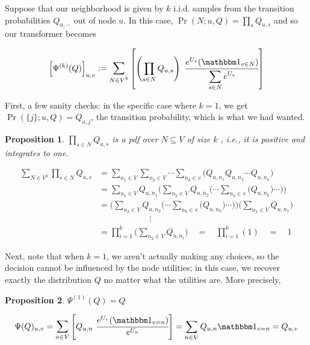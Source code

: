 \documentclass{article}
\newtheorem{prop}{Proposition}
\theoremstyle{definition}
\begin{document}
	Suppose that our neighborhood is given by $k$ i.i.d. samples from the transition probabilities $Q_{u,-}$ out of node $u$. In this case, $\Pr(N;u,Q) = \prod_{s} Q_{u,s}$ and so our transformer becomes
	
	\begin{equation}
		\Big[\Psi^{(k)}(Q)\Big]_{u,v} := \mathlarger{\sum}_{N \in V^{k}} \left[\left(\prod_{s \in N}Q_{u,s}\right) ~\cfrac{ e^{U_v}  (\mathbbm 1_{v \in N})}{ \displaystyle \sum\limits_{ s \in N } e^{U_s} } \right]
	\end{equation}
	
	First, a few sanity checks: in the specific case where $k = 1$, we get $\Pr(\{j\}; u, Q) = Q_{u,j}$, the transition probability, which is what we had wanted.\\
	
	\begin{prop}
		$\prod_{s \in N}Q_{u,s}$ is a pdf over $N \subseteq V$ of size $k$ , i.e., it is positive and integrates to one.
	\end{prop}
	\begin{prf}
		\begin{align*}
			\sum_{N \in V^{k}}\prod_{s \in N}Q_{u,s} &= 
				\sum_{n_1 \in V} \sum_{n_2 \in V}\cdots \sum_{n_k \in v} \Big(Q_{u,n_1}Q_{u,n_2} \cdots Q_{u,n_k}\Big) \\
				&= \sum_{n_1 \in V} Q_{u,n_1} \Big(\sum_{n_2 \in V}Q_{u,n_2} \Big( \cdots \sum_{n_k \in v} \Big(Q_{u,n_k}\Big)\cdots\Big)\Big) \\
				&= \Big(\sum_{n_2 \in V}Q_{u,n_2} \Big( \cdots \sum_{n_k \in v} \Big(Q_{u,n_k}\Big)\cdots\Big)\Big) \Big(\sum_{n_1 \in V} Q_{u,n_1} \Big)\\
				&\hspace{1in}\vdots\\
				&= \prod_{i=1}^k \Big( \sum_{n_2 \in V}Q_{u,n_i} \Big) \quad
				=\quad \prod_{i=1}^k (1) \quad=\quad 1
		\end{align*}
	\end{prf}

	Next, note that when $k=1$, we aren't actually making any choices, so the decision cannot be influenced by the node utilities; in this case, we recover exactly the distribution $Q$ no matter what the utilities are. More precisely,\\
	
	\begin{prop}
		$\Psi^{(1)}(Q) = Q$
	\end{prop}
	\begin{prf}
		\[ \Psi(Q)_{u,v} = \mathlarger{\sum}_{n \in V} \left[Q_{u,n} ~\cfrac{ e^{U_v}  (\mathbbm 1_{v = n})}{ e^{U_n} }\right] = \sum_{n \in V} Q_{u,n} \mathbbm 1_{v=n} = Q_{u,v} 
		 \]
	\end{prf}
\end{document}
